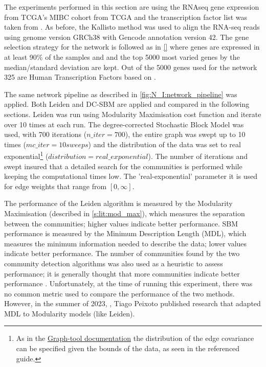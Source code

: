 The experiments performed in this section are using the RNAseq gene expression from TCGA's MIBC cohort from TCGA and the transcription factor list was taken from \citet{Lambert2018-el}. As before, the Kallisto method was used to align the RNA-seq reads using genome version GRCh38 with Gencode annotation version 42. The gene selection strategy for the network is followed as in \ref{} where genes are expressed in at least 90\% of the samples and and the top 5000 most varied genes by the median/standard deviation are kept. Out of the 5000 genes used for the network 325 are Human Transcription Factors based on \citet{Lambert2018-el}.

The same network pipeline as described in \cref{fig:N_I:network_pipeline} was applied. Both Leiden and DC-SBM are applied and compared in the following sections. Leiden was run using Modularity Maximisation cost function and iterate over 10 times at each run. The degree-corrected Stochastic Block Model was used, with 700 iterations ($n\_iter=700$), the entire graph was swept up to 10 times ($mc\_iter = 10 sweeps$) and the distribution of the data was set to real exponential\footnote{As in the \href{https://graph-tool.skewed.de/static/doc/demos/inference/inference.html}{Graph-tool documentation} the distribution of the edge covariance can be specified given the bounds of the data, as seen in the referenced guide.} ($distribution = real\_exponential$). The number of iterations and swept insured that a detailed search for the communities is performed while keeping the computational times low. The 'real-exponential' parameter it is used for edge weights that range from $[0, \infty]$.

The performance of the Leiden algorithm is measured by the Modularity Maximisation (described in \cref{s:lit:mod_max}), which measures the separation between the communities; higher values indicate better performance. SBM performance is measured by the Minimum Description Length (MDL), which measures the minimum information needed to describe the data; lower values indicate better performance. The number of communities found by the two community detection algorithms was also used as a heuristic to assess performance; it is generally thought that more communities indicate better performance \cite{Care2019-ij}. Unfortunately, at the time of running this experiment, there was no common metric used to compare the performance of the two methods. However, in the summer of 2023, \cite{Peixoto2023-mw}, Tiago Peixoto published research that adapted MDL to Modularity models (like Leiden).


